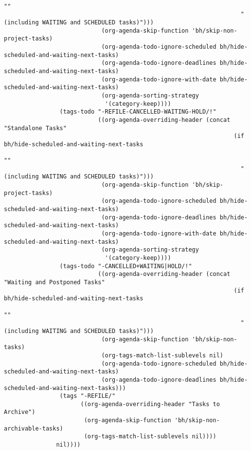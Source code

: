 \documentclass[11pt]{scrartcl}
\begin{document}
\begin{verbatim}
                                                                      ""
                                                                    " (including WAITING and SCHEDULED tasks)")))
                            (org-agenda-skip-function 'bh/skip-non-project-tasks)
                            (org-agenda-todo-ignore-scheduled bh/hide-scheduled-and-waiting-next-tasks)
                            (org-agenda-todo-ignore-deadlines bh/hide-scheduled-and-waiting-next-tasks)
                            (org-agenda-todo-ignore-with-date bh/hide-scheduled-and-waiting-next-tasks)
                            (org-agenda-sorting-strategy
                             '(category-keep))))
                (tags-todo "-REFILE-CANCELLED-WAITING-HOLD/!"
                           ((org-agenda-overriding-header (concat "Standalone Tasks"
                                                                  (if bh/hide-scheduled-and-waiting-next-tasks
                                                                      ""
                                                                    " (including WAITING and SCHEDULED tasks)")))
                            (org-agenda-skip-function 'bh/skip-project-tasks)
                            (org-agenda-todo-ignore-scheduled bh/hide-scheduled-and-waiting-next-tasks)
                            (org-agenda-todo-ignore-deadlines bh/hide-scheduled-and-waiting-next-tasks)
                            (org-agenda-todo-ignore-with-date bh/hide-scheduled-and-waiting-next-tasks)
                            (org-agenda-sorting-strategy
                             '(category-keep))))
                (tags-todo "-CANCELLED+WAITING|HOLD/!"
                           ((org-agenda-overriding-header (concat "Waiting and Postponed Tasks"
                                                                  (if bh/hide-scheduled-and-waiting-next-tasks
                                                                      ""
                                                                    " (including WAITING and SCHEDULED tasks)")))
                            (org-agenda-skip-function 'bh/skip-non-tasks)
                            (org-tags-match-list-sublevels nil)
                            (org-agenda-todo-ignore-scheduled bh/hide-scheduled-and-waiting-next-tasks)
                            (org-agenda-todo-ignore-deadlines bh/hide-scheduled-and-waiting-next-tasks)))
                (tags "-REFILE/"
                      ((org-agenda-overriding-header "Tasks to Archive")
                       (org-agenda-skip-function 'bh/skip-non-archivable-tasks)
                       (org-tags-match-list-sublevels nil))))
               nil))))
\end{verbatim}
\end{document}
